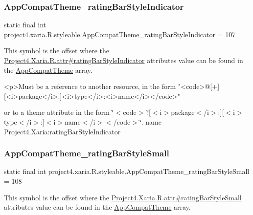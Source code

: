 \subsubsection{\texorpdfstring{App\+Compat\+Theme\+\_\+rating\+Bar\+Style\+Indicator}{AppCompatTheme\_ratingBarStyleIndicator}}
{\footnotesize\ttfamily static final int project4.\+xaria.\+R.\+styleable.\+App\+Compat\+Theme\+\_\+rating\+Bar\+Style\+Indicator = 107\hspace{0.3cm}{\ttfamily [static]}}

This symbol is the offset where the \hyperlink{}{Project4.\+Xaria.\+R.\+attr\#rating\+Bar\+Style\+Indicator} attribute\textquotesingle{}s value can be found in the \hyperlink{classproject4_1_1xaria_1_1R_1_1styleable_aad8bec413e2350f9404e6ff0e831a85d}{App\+Compat\+Theme} array.

\begin{DoxyVerb}      <p>Must be a reference to another resource, in the form "<code>@[+][<i>package</i>:]<i>type</i>:<i>name</i></code>"
\end{DoxyVerb}
 or to a theme attribute in the form \char`\"{}$<$code$>$?\mbox{[}$<$i$>$package$<$/i$>$\+:\mbox{]}\mbox{[}$<$i$>$type$<$/i$>$\+:\mbox{]}$<$i$>$name$<$/i$>$$<$/code$>$\char`\"{}.  name Project4.\+Xaria\+:rating\+Bar\+Style\+Indicator \mbox{\label{classproject4_1_1xaria_1_1R_1_1styleable_aaf8de5a19d0b128396fe6e219e2988aa}} 
\subsubsection{\texorpdfstring{App\+Compat\+Theme\+\_\+rating\+Bar\+Style\+Small}{AppCompatTheme\_ratingBarStyleSmall}}
{\footnotesize\ttfamily static final int project4.\+xaria.\+R.\+styleable.\+App\+Compat\+Theme\+\_\+rating\+Bar\+Style\+Small = 108\hspace{0.3cm}{\ttfamily [static]}}

This symbol is the offset where the \hyperlink{}{Project4.\+Xaria.\+R.\+attr\#rating\+Bar\+Style\+Small} attribute\textquotesingle{}s value can be found in the \hyperlink{classproject4_1_1xaria_1_1R_1_1styleable_aad8bec413e2350f9404e6ff0e831a85d}{App\+Compat\+Theme} array.

